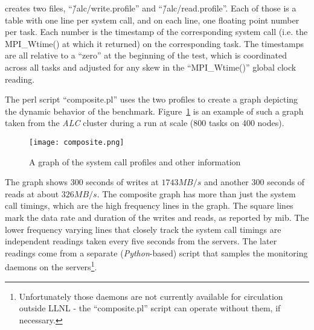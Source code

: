\documentclass{article}
\begin{document}
creates two files, ``\~/alc/write.profile'' and ``\~/alc/read.profile''.
Each of those is a table with one line per system call, and on each
line, one floating point number per task.  Each number is the
timestamp of the corresponding system call (i.e. the MPI\_Wtime() at
which it returned) on the corresponding task.  The timestamps are all
relative to a ``zero'' at the beginning of the test, which is
coordinated across all tasks and adjusted for any skew in the
``MPI\_Wtime()'' global clock reading.

The perl script ``composite.pl'' uses the two profiles to create a
graph depicting the dynamic behavior of the benchmark.
Figure~\ref{composite.fig} is an example of such a graph taken from
the {\em ALC} cluster during a run at scale (800 tasks on 400 nodes).

\begin{figure}
  \texttt{[image: composite.png]}
\caption{A graph of the system call profiles and other information}
\label{composite.fig}
\end{figure}

The graph shows 300 seconds of writes at $1743 MB/s$ and another 300
seconds of reads at about $326 MB/s$.  The composite graph has more
than just the system call timings, which are the high frequency lines
in the graph.  The square lines mark the data rate and duration of the
writes and reads, as reported by mib.  The lower frequency varying
lines that closely track the system call timings are independent
readings taken every five seconds from the servers.  The later
readings come from a separate ({\em Python}-based) script that samples
the monitoring daemons on the servers\footnote{Unfortunately those
daemons are not currently available for circulation outside LLNL - the
``composite.pl'' script can operate without them, if necessary.}.
\end{document}
